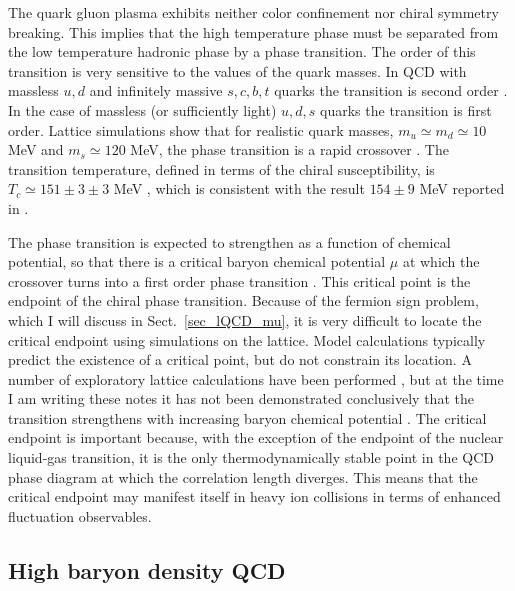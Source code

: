  The quark gluon plasma exhibits neither color confinement nor chiral
symmetry breaking. This implies that the high temperature phase must
be separated from the low temperature hadronic phase by a phase transition.
The order of this transition is very sensitive to the values of the quark
masses. In QCD with massless $u,d$ and infinitely massive $s,c,b,t$ quarks
the transition is second order \cite{Pisarski:1983ms}. In the case of
massless (or sufficiently light) $u,d,s$ quarks the transition is first
order. Lattice simulations show that for realistic quark masses, $m_u
\simeq m_d\simeq 10$ MeV and $m_s\simeq 120$ MeV, the phase transition
is a rapid crossover \cite{Aoki:2006we,Bazavov:2011nk}. The transition 
temperature, defined in terms of the chiral susceptibility, is $T_c\simeq 
151\pm 3 \pm 3$ MeV \cite{Aoki:2006br,Aoki:2009sc}, which is consistent with 
the result $154 \pm 9$ MeV reported in \cite{Bazavov:2011nk,Bazavov:2014pvz}.
 
 The phase transition is expected to strengthen as a function of chemical 
potential, so that there is a critical baryon chemical potential $\mu$ at 
which the crossover turns into a first order phase transition 
\cite{Stephanov:2004wx}. This critical point is the endpoint of the chiral 
phase transition. Because of the fermion sign problem, which I will discuss 
in Sect.~\ref{sec_lQCD_mu}, it is very difficult to locate the critical 
endpoint using simulations on the lattice. Model calculations typically 
predict the existence of a critical point, but do not constrain its 
location. A number of exploratory lattice calculations have been performed 
\cite{Fodor:2001pe,Allton:2002zi,Karsch:2003va,Fodor:2004nz,Gavai:2008zr,Datta:2012pj},
but at the time I am writing these notes it has not been demonstrated
conclusively that the transition strengthens with increasing baryon 
chemical potential \cite{deForcrand:2010he}. The critical endpoint is
important because, with the exception of the endpoint of the nuclear 
liquid-gas transition, it is the only thermodynamically stable point 
in the QCD phase diagram at which the correlation length diverges. This 
means that the critical endpoint may manifest itself in heavy ion collisions 
in terms of enhanced fluctuation observables\cite{Stephanov:1998dy}.
  
\subsection{High baryon density QCD}
\label{sec_qcd_mu}
 
